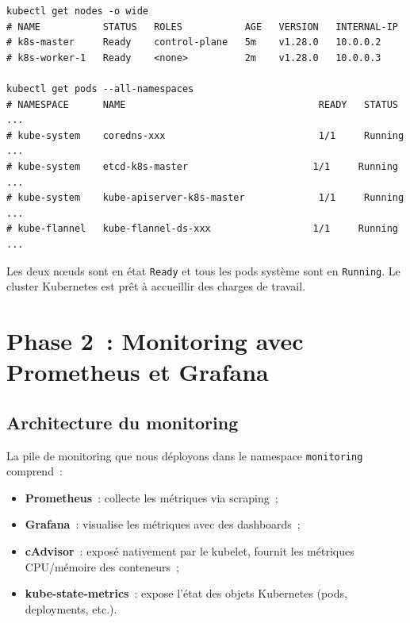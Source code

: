 \documentclass[12pt,a4paper,french]{report}
\newcommand{\kw}[1]{\textbf{#1}}
\begin{document}
\begin{lstlisting}[style=bash, caption={Vérification de l'état du cluster}]
kubectl get nodes -o wide
# NAME           STATUS   ROLES           AGE   VERSION   INTERNAL-IP
# k8s-master     Ready    control-plane   5m    v1.28.0   10.0.0.2
# k8s-worker-1   Ready    <none>          2m    v1.28.0   10.0.0.3

kubectl get pods --all-namespaces
# NAMESPACE      NAME                                  READY   STATUS    ...
# kube-system    coredns-xxx                           1/1     Running   ...
# kube-system    etcd-k8s-master                      1/1     Running   ...
# kube-system    kube-apiserver-k8s-master             1/1     Running   ...
# kube-flannel   kube-flannel-ds-xxx                  1/1     Running   ...
\end{lstlisting}

\begin{resultbox}
Les deux nœuds sont en état \texttt{Ready} et tous les pods système sont en \texttt{Running}. Le cluster Kubernetes est prêt à accueillir des charges de travail.
\end{resultbox}

\chapter{Phase 2~: Monitoring avec Prometheus et Grafana}
\label{chap:phase2}

\section{Architecture du monitoring}

La pile de monitoring que nous déployons dans le namespace \texttt{monitoring} comprend~:
\begin{itemize}
  \item \kw{Prometheus}~: collecte les métriques via scraping~;
  \item \kw{Grafana}~: visualise les métriques avec des dashboards~;
  \item \kw{cAdvisor}~: exposé nativement par le kubelet, fournit les métriques CPU/mémoire des conteneurs~;
  \item \kw{kube-state-metrics}~: expose l'état des objets Kubernetes (pods, deployments, etc.).
\end{itemize}
\end{document}
